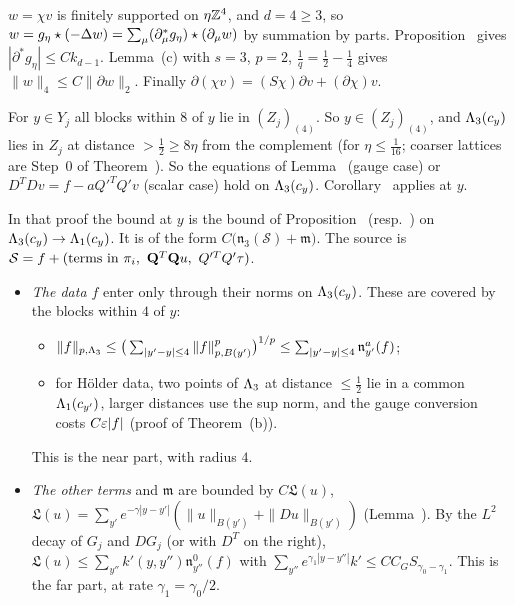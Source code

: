 \begin{detail}\label{d9:sobolev}
$w=\chi v$ is finitely supported on $\eta\mathbb Z^4$, and $d=4\ge3$, so $w=g_\eta\star(-\Delta w)=\sum_\mu(\partial^*_\mu g_\eta)\star(\partial_\mu w)$ by summation by parts. Proposition~ gives $|\partial^*g_\eta|\le Ck_{d-1}$. Lemma~(c) with $s=3$, $p=2$, $\frac1q=\frac12-\frac14$ gives $\|w\|_4\le C\|\partial w\|_2$. Finally $\partial(\chi v)=(S\chi)\partial v+(\partial\chi)v$.
\end{detail}

\begin{detail}\label{d9:int-factors}
\begin{step}[Geometry]
For $y\in Y_j$ all blocks within $8$ of $y$ lie in $(Z_j)_{(4)}$. So $y\in(Z_j)_{(4)}$, and $\Lambda_3(c_y)$ lies in $Z_j$ at distance $>\frac12\ge8\eta$ from the complement (for $\eta\le\frac1{16}$; coarser lattices are Step~0 of Theorem~). So the equations of Lemma~ (gauge case) or $D^TDv=f-aQ'^TQ'v$ (scalar case) hold on $\Lambda_3(c_y)$. Corollary~ applies at $y$.
\end{step}
\begin{step}
In that proof the bound at $y$ is the bound of Proposition~ (resp.\ ) on $\Lambda_3(c_y)\to\Lambda_1(c_y)$. It is of the form $C\big(\mathfrak n_3(\mathcal S)+\mathfrak m\big)$. The source is $\mathcal S=f+(\text{terms in }\pi_i,\ \mathbf Q^T\mathbf Q u,\ Q'^TQ'\tau)$.
\begin{itemize}
\item \emph{The data $f$} enter only through their norms on $\Lambda_3(c_y)$. These are covered by the blocks within $4$ of $y$:
\begin{itemize}
\item $\|f\|_{p,\Lambda_3}\le\big(\sum_{|y'-y|\le4}\|f\|^p_{p,B(y')}\big)^{1/p}\le\sum_{|y'-y|\le4}\mathfrak n^a_{y'}(f)$;
\item for H\"older data, two points of $\Lambda_3$ at distance $\le\frac12$ lie in a common $\Lambda_1(c_{y'})$, larger distances use the sup norm, and the gauge conversion costs $C\varepsilon|f|$ (proof of Theorem~(b)).
\end{itemize}
This is the near part, with radius $4$.
\item \emph{The other terms} and $\mathfrak m$ are bounded by $C\mathfrak L(u)$, $\mathfrak L(u)=\sum_{y'}e^{-\gamma|y-y'|}(\|u\|_{B(y')}+\|Du\|_{B(y')})$ (Lemma~). By the $L^2$ decay of $G_j$ and $DG_j$ (or with $D^T$ on the right), $\mathfrak L(u)\le\sum_{y''}k'(y,y'')\mathfrak n^0_{y''}(f)$ with $\sum_{y''}e^{\gamma_1|y-y''|}k'\le CC_GS_{\gamma_0-\gamma_1}$. This is the far part, at rate $\gamma_1=\gamma_0/2$.

\end{itemize}
\end{step}
\end{detail}
